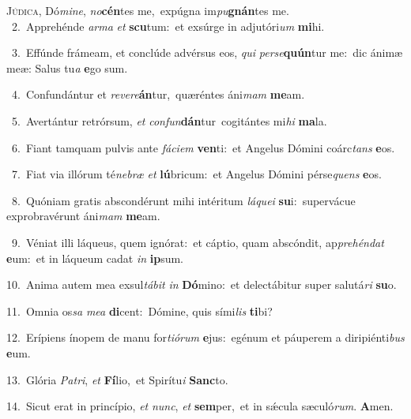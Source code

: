 \lettrine{\initial\textcolor{\initialcolor}{J}}{údica,} Dó\-\textit{mi}\-\textit{ne}, \textit{no}\-\textbf{cén}tes me,~\star expúgna im\-\textit{pu}\-\textbf{gnán}tes me.\\
{\numbfont\textcolor{\numbcolor}{~2.}}~Apprehénde \textit{ar}\-\textit{ma} \textit{et} \textbf{scu}\-tum:~\star et exsúrge in adjutóri\textit{um} \textbf{mi}\-hi.\par
{\numbfont\textcolor{\numbcolor}{~3.}}~Effúnde frámeam, et conclúde advérsus eos, \textit{qui} \textit{per}\-\textit{se}\textbf{quún}tur me:~\star dic ánimæ meæ: Salus tu\textit{a} \textbf{e}\-go sum.\par
{\numbfont\textcolor{\numbcolor}{~4.}}~Confundántur et \textit{re}\-\textit{ve}\textit{re}\textbf{án}tur,~\star quæréntes áni\textit{mam} \textbf{me}\-am.\par
{\numbfont\textcolor{\numbcolor}{~5.}}~Avertántur retrórsum, \textit{et} \textit{con}\-\textit{fun}\textbf{dán}tur~\star cogitántes mi\textit{hi} \textbf{ma}\-la.\par
{\numbfont\textcolor{\numbcolor}{~6.}}~Fiant tamquam pulvis ante \textit{fá}\-\textit{ci}\textit{em} \textbf{ven}\-ti:~\star et Angelus Dómini coárc\textit{tans} \textbf{e}\-os.\par
{\numbfont\textcolor{\numbcolor}{~7.}}~Fiat via illórum té\-\textit{ne}\-\textit{bræ} \textit{et} \textbf{lú}\-bricum:~\star et Angelus Dómini pérse\textit{quens} \textbf{e}\-os.\par
{\numbfont\textcolor{\numbcolor}{~8.}}~Quóniam gratis abscondérunt mihi intéritum \textit{lá}\-\textit{que}\textit{i} \textbf{su}\-i:~\star supervácue exprobravérunt áni\textit{mam} \textbf{me}\-am.\par
{\numbfont\textcolor{\numbcolor}{~9.}}~Véniat illi láqueus, quem ignórat:~\dagger et cáptio, quam abscóndit, ap\-\textit{pre}\-\textit{hén}\textit{dat} \textbf{e}\-um:~\star et in láqueum cadat \textit{in} \textbf{ip}\-sum.\par
{\numbfont\textcolor{\numbcolor}{10.}}~Anima autem mea exsul\-\textit{tá}\-\textit{bit} \textit{in} \textbf{Dó}\-mino:~\star et delectábitur super salutá\textit{ri} \textbf{su}\-o.\par
{\numbfont\textcolor{\numbcolor}{11.}}~Omnia os\textit{sa} \textit{me}\-\textit{a} \textbf{di}\-cent:~\star Dómine, quis sími\textit{lis} \textbf{ti}\-bi?\par
{\numbfont\textcolor{\numbcolor}{12.}}~Erípiens ínopem de manu for\-\textit{ti}\-\textit{ó}\textit{rum} \textbf{e}\-jus:~\star egénum et páuperem a diripiénti\textit{bus} \textbf{e}\-um.\par
{\numbfont\textcolor{\numbcolor}{13.}}~Glória \textit{Pa}\-\textit{tri}, \textit{et} \textbf{Fí}\-lio,~\star et Spirítu\textit{i} \textbf{Sanc}\-to.\par
{\numbfont\textcolor{\numbcolor}{14.}}~Sicut erat in princípio, \textit{et} \textit{nunc}\-, \textit{et} \textbf{sem}\-per,~\star et in sǽcula sæculó\-\textit{rum}\-. \textbf{A}\-men.\par
